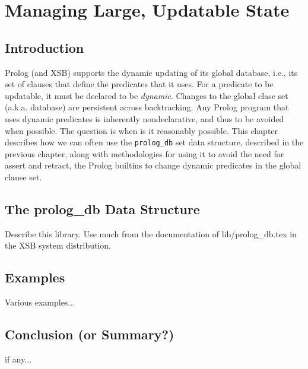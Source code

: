 \chapter{Managing Large, Updatable State}

\section{Introduction}
Prolog (and XSB) supports the dynamic updating of its global database,
i.e., its set of clauses that define the predicates that it uses.  For
a predicate to be updatable, it must be declared to be {\em dynamic}.
Changes to the global clase set (a.k.a. database) are persistent
across backtracking.  Any Prolog program that uses dynamic predicates
is inherently nondeclarative, and thus to be avoided when possible.
The question is when is it reasonably possible.  This chapter
describes how we can often use the {\tt prolog\_db} set data
structure, described in the previous chapter, along with methodologies
for using it to avoid the need for assert and retract, the Prolog
builtins to change dynamic predicates in the global clause set.

\section{The prolog\_db Data Structure}

Describe this library.  Use much from the documentation of
lib/prolog\_db.tex in the XSB system distribution.

\section{Examples}

Various examples...

\section{Conclusion (or Summary?)}
if any...
